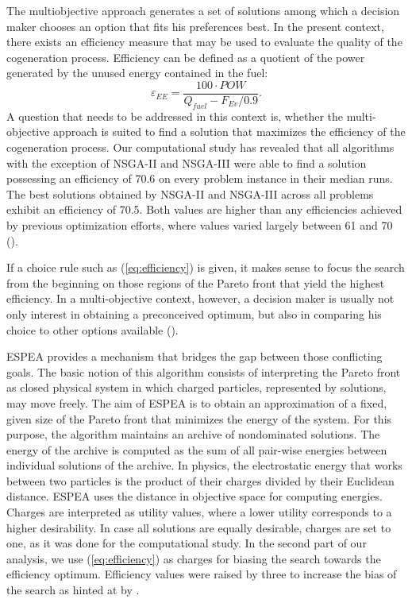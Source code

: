 The multiobjective approach generates a set of solutions among which a decision maker chooses an option that fits his preferences best. In the present context, there exists an efficiency measure that may be used to evaluate the quality of the cogeneration process. Efficiency can be defined as a quotient of the power generated by the unused energy contained in the fuel:
%
\begin{equation}
\label{eq:efficiency}
\varepsilon_{EE} = \frac{100 \cdot POW}{Q_{fuel} - F_{Ev}/0.9}.
\end{equation}
%
A question that needs to be addressed in this context is, whether the multi-objective approach is suited to find a solution that maximizes the efficiency of the cogeneration process. Our computational study has revealed that all algorithms with the exception of NSGA-II and NSGA-III were able to find a solution possessing an efficiency of 70.6 on every problem instance in their median runs. The best solutions obtained by NSGA-II and NSGA-III across all problems exhibit an efficiency of 70.5. Both values are higher than any efficiencies achieved by previous optimization efforts, where values varied largely between 61 and 70 (\cite[Fig. 11]{Seijo2016309}).

If a choice rule such as (\ref{eq:efficiency}) is given, it makes sense to focus the search from the beginning on those regions of the Pareto front that yield the highest efficiency. In a multi-objective context, however, a decision maker is usually not only interest in obtaining a preconceived optimum, but also in comparing his choice to other options available (\cite{roy1996multicriteria,kahneman1979prospect}).

ESPEA provides a mechanism that bridges the gap between those conflicting goals. The basic notion of this algorithm consists of interpreting the Pareto front as closed physical system in which charged particles, represented by solutions, may move freely. The aim of ESPEA is to obtain an approximation of a fixed, given size of the Pareto front that minimizes the energy of the system. For this purpose, the algorithm maintains an archive of nondominated solutions. The energy of the archive is computed as the sum of all pair-wise energies between individual solutions of the archive. In physics, the electrostatic energy that works between two particles is the product of their charges divided by their Euclidean distance. ESPEA uses the distance in objective space for computing energies. Charges are interpreted as utility values, where a lower utility corresponds to a higher desirability. In case all solutions are equally desirable, charges are set to one, as it was done for the computational study. In the second part of our analysis, we use (\ref{eq:efficiency}) as charges for biasing the search towards the efficiency optimum. Efficiency values were raised by three to increase the bias of the search as hinted at by \cite{espea}.

